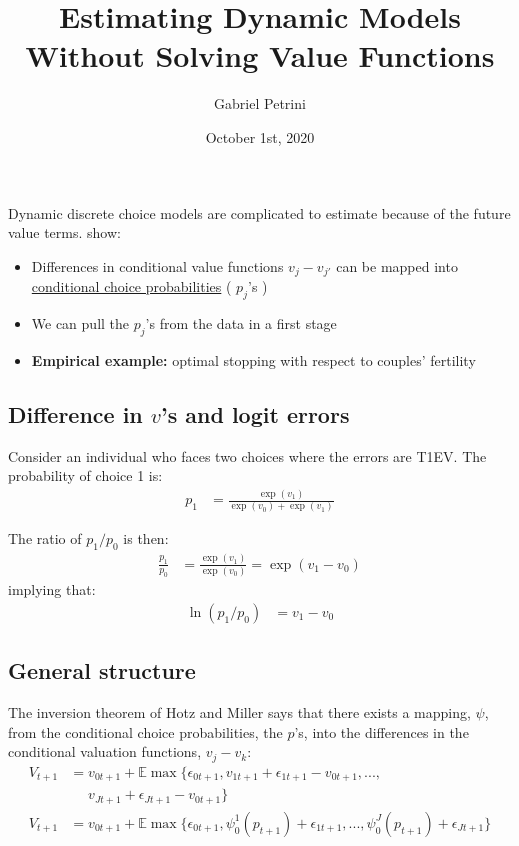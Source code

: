 \documentclass[11pt]{article}
\author{Gabriel Petrini}
\date{October 1st, 2020}
\title{Estimating Dynamic Models Without Solving Value Functions}
\begin{document}
\maketitle
\tableofcontents





\section*{\cite{hotzMiller1993}}
\label{sec:org9c92db5}

Dynamic discrete choice models are complicated to estimate because of the future value terms. \citet{hotzMiller1993} show:

\begin{itemize}
\item Differences in conditional value functions \(v_j-v_{j'}\) can be mapped into \uline{conditional choice probabilities} ( \(p_j\)'s )
\item We can pull the \(p_j\)'s from the data in a first stage
\item \textbf{Empirical example:} optimal stopping with respect to couples' fertility
\end{itemize}

\subsection*{Difference in \(v\)'s and logit errors}
\label{sec:orgc62eac5}

Consider an individual who faces two choices where the errors are T1EV. The probability of choice 1 is:
\begin{align*}
p_1&=\frac{\exp(v_1)}{\exp(v_0)+\exp(v_1)}
\end{align*}

The ratio of \(p_1/p_0\) is then:
\begin{align*}
\frac{p_1}{p_0}&=\frac{\exp(v_1)}{\exp(v_0)} = \exp(v_1 - v_0)
\end{align*}
implying that:
\begin{align*}
\ln(p_1/p_0)&=v_1-v_0
\end{align*}

\subsection*{General structure}
\label{sec:org916f1e4}

The inversion theorem of Hotz and Miller says that there exists a mapping, \(\psi\), from the conditional choice probabilities, the \(p\)'s, into the differences in the conditional valuation functions, \(v_j-v_k\):
\begin{align*}
V_{t+1}&=v_{0t+1}+\mathbb{E}\max\{\epsilon_{0t+1},v_{1t+1}+\epsilon_{1t+1}-v_{0t+1},...,\\
&\phantom{\text{----}}v_{{J}t+1}+\epsilon_{{J}t+1}-v_{0t+1}\}\\
V_{t+1}&=v_{0t+1}+\mathbb{E}\max\{\epsilon_{0t+1},\psi_0^1(p_{t+1})+\epsilon_{1t+1},...,\psi_0^{{J}}(p_{t+1})+\epsilon_{{J}t+1}\}
\end{align*}
\end{document}
